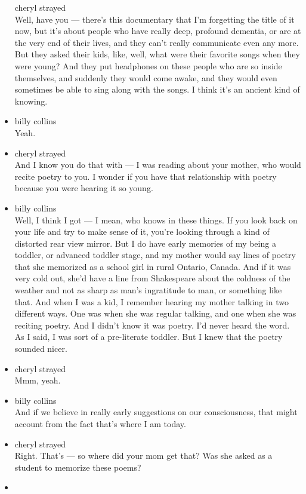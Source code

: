 \begin{itemize}
  cheryl strayed\\
  Well, have you --- there's this documentary that I'm forgetting the
  title of it now, but it's about people who have really deep, profound
  dementia, or are at the very end of their lives, and they can't really
  communicate even any more. But they asked their kids, like, well, what
  were their favorite songs when they were young? And they put
  headphones on these people who are so inside themselves, and suddenly
  they would come awake, and they would even sometimes be able to sing
  along with the songs. I think it's an ancient kind of knowing.
\item
  billy collins\\
  Yeah.
\item
  cheryl strayed\\
  And I know you do that with --- I was reading about your mother, who
  would recite poetry to you. I wonder if you have that relationship
  with poetry because you were hearing it so young.
\item
  billy collins\\
  Well, I think I got --- I mean, who knows in these things. If you look
  back on your life and try to make sense of it, you're looking through
  a kind of distorted rear view mirror. But I do have early memories of
  my being a toddler, or advanced toddler stage, and my mother would say
  lines of poetry that she memorized as a school girl in rural Ontario,
  Canada. And if it was very cold out, she'd have a line from
  Shakespeare about the coldness of the weather and not as sharp as
  man's ingratitude to man, or something like that. And when I was a
  kid, I remember hearing my mother talking in two different ways. One
  was when she was regular talking, and one when she was reciting
  poetry. And I didn't know it was poetry. I'd never heard the word. As
  I said, I was sort of a pre-literate toddler. But I knew that the
  poetry sounded nicer.
\item
  cheryl strayed\\
  Mmm, yeah.
\item
  billy collins\\
  And if we believe in really early suggestions on our consciousness,
  that might account from the fact that's where I am today.
\item
  cheryl strayed\\
  Right. That's --- so where did your mom get that? Was she asked as a
  student to memorize these poems?
\item

\end{itemize}
